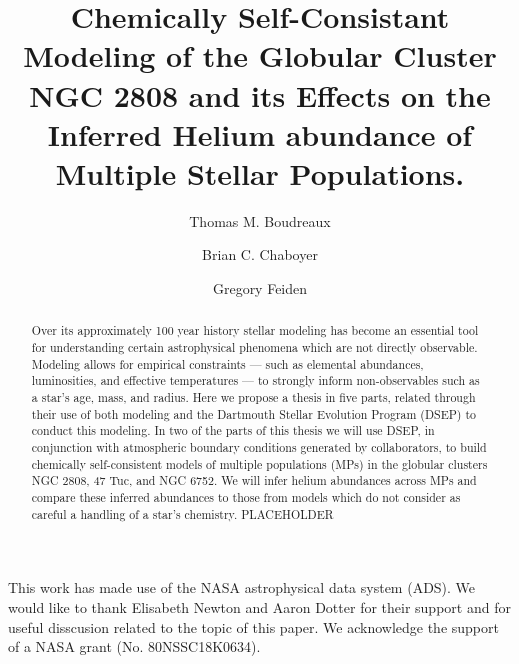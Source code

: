 \documentclass[twocolumn,linenumbers]{src/aastex631}
\begin{document}
\title{Chemically Self-Consistant Modeling of the Globular Cluster NGC 2808 and its Effects on the Inferred Helium abundance of Multiple Stellar Populations.}


\author[0000-0002-2600-7513]{Thomas M. Boudreaux}

\author[0000-0003-3096-4161]{Brian C. Chaboyer}

\author[0000-0002-2012-7215]{Gregory Feiden}


\begin{abstract}
	Over its approximately 100 year history stellar modeling has become an
	essential tool for understanding certain astrophysical phenomena which are not
	directly observable. Modeling allows for empirical constraints --- such as
	elemental abundances, luminosities, and effective temperatures --- to strongly
	inform non-observables such as a star's age, mass, and radius. Here we propose a
	thesis in five parts, related through their use of both modeling and the
	Dartmouth Stellar Evolution Program (DSEP) to conduct this modeling. In two of
	the parts of this thesis we will use DSEP, in conjunction with atmospheric
	boundary conditions generated by collaborators, to build chemically
	self-consistent models of multiple populations (MPs) in the globular clusters
	NGC 2808, 47 Tuc, and NGC 6752. We will infer helium abundances across MPs and
	compare these inferred abundances to those from models which do not consider as
	careful a handling of a star's chemistry. PLACEHOLDER
\end{abstract}

\keywords{}






\begin{acknowledgments}
	This work has made use of the NASA astrophysical data system (ADS). We
	would like to thank Elisabeth Newton and Aaron Dotter for their support and
	for useful disscusion related to the topic of this paper. We acknowledge
	the support of a NASA grant (No. 80NSSC18K0634). 
\end{acknowledgments}



{}

\end{document}
